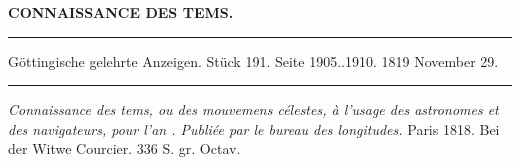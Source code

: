 \clearpage
{}
\noindent\makebox[10mm][l]{}%
\parbox[b]{\dimexpr\textwidth-20mm\relax}{\centering\small\textbf{CONNAISSANCE DES TEMS.}}%
\par\nobreak\medskip
\begin{center}
\parbox{.92\linewidth}{\centering\small
\rule{\linewidth}{.3pt}\par\smallskip
Göttingische gelehrte Anzeigen. Stück 191. Seite 1905..1910. 1819 November 29.\par\smallskip
\rule{\linewidth}{.3pt}}
\end{center}
\par\medskip

\noindent\emph{Connaissance des tems, ou des mouvemens célestes, à l'usage des astronomes et des navigateurs, pour l'an {}. Publiée par le bureau des longitudes.} Paris 1818. Bei der Witwe Courcier. 336 S. gr. Octav.

